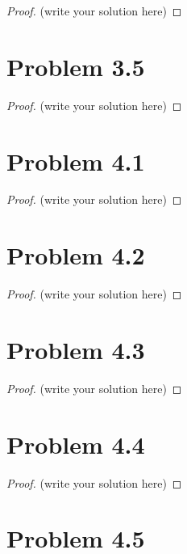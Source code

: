 \documentclass[12pt]{article}
\begin{document}
\begin{proof}
	(write your solution here)
\end{proof}

\newpage 

\section{Problem 3.5}

\begin{proof}
	(write your solution here)
\end{proof}

\newpage 

\section{Problem 4.1}

\begin{proof}
	(write your solution here)
\end{proof}

\newpage 

\section{Problem 4.2}

\begin{proof}
	(write your solution here)
\end{proof}

\newpage 

\section{Problem 4.3}

\begin{proof}
	(write your solution here)
\end{proof}

\newpage 

\section{Problem 4.4}

\begin{proof}
	(write your solution here)
\end{proof}

\newpage 

\section{Problem 4.5}
\end{document}
